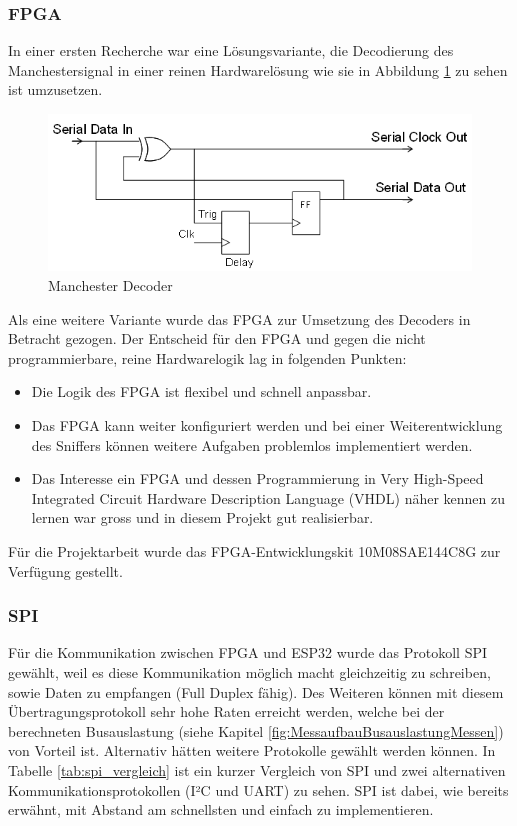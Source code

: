 \subsubsection{FPGA}
In einer ersten Recherche war eine Lösungsvariante, die Decodierung des Manchestersignal in einer reinen Hardwarelösung wie sie in Abbildung \ref{fig:Manchester Decoder} zu sehen ist umzusetzen.

\begin{figure}[H]
    \centering
    \includegraphics[width=0.6\linewidth]{Figures/Chap3/Design Eigener Sniffer/manchester_decoder.png}
    \caption{Manchester Decoder \cite{Manchester_Decoding}}
    \label{fig:Manchester Decoder}
\end{figure}

Als eine weitere Variante wurde das FPGA zur Umsetzung des Decoders in Betracht gezogen.
Der Entscheid für den FPGA und gegen die nicht programmierbare, reine Hardwarelogik lag in folgenden Punkten:
\begin{itemize}
  \item Die Logik des FPGA ist flexibel und schnell anpassbar.
  \item Das FPGA kann weiter konfiguriert werden und bei einer Weiterentwicklung des Sniffers können weitere Aufgaben problemlos implementiert werden.
  \item Das Interesse ein FPGA und dessen Programmierung in Very High-Speed Integrated Circuit Hardware Description Language (VHDL) näher kennen zu lernen war gross und in diesem Projekt gut realisierbar.
\end{itemize}

Für die Projektarbeit wurde das FPGA-Entwicklungskit 10M08SAE144C8G zur Verfügung gestellt.

\subsubsection{SPI}
Für die Kommunikation zwischen FPGA und ESP32 wurde das Protokoll SPI gewählt, weil es diese Kommunikation möglich macht gleichzeitig zu schreiben, sowie Daten zu empfangen (Full Duplex fähig). Des Weiteren können mit diesem Übertragungsprotokoll sehr hohe Raten erreicht werden, welche bei der berechneten Busauslastung (siehe Kapitel \ref{fig:MessaufbauBusauslastungMessen}) von Vorteil ist. Alternativ hätten weitere Protokolle gewählt werden können. In Tabelle \ref{tab:spi_vergleich} ist ein kurzer Vergleich von SPI und zwei alternativen Kommunikationsprotokollen (I²C und UART) zu sehen. SPI ist dabei, wie bereits erwähnt, mit Abstand am schnellsten und einfach zu implementieren. \cite{SPI}

